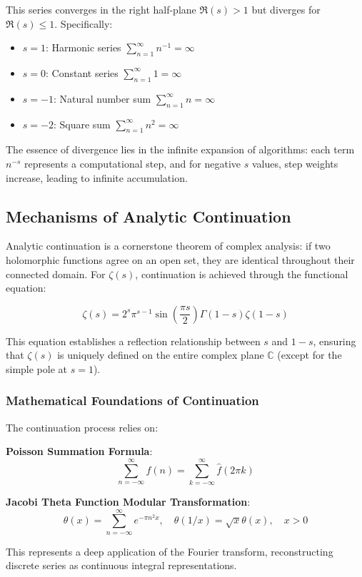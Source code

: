 \documentclass[11pt]{article}
\begin{document}
This series converges in the right half-plane $\Re(s) > 1$ but diverges for $\Re(s) \leq 1$. Specifically:
\begin{itemize}
\item $s = 1$: Harmonic series $\sum_{n=1}^{\infty} n^{-1} = \infty$
\item $s = 0$: Constant series $\sum_{n=1}^{\infty} 1 = \infty$
\item $s = -1$: Natural number sum $\sum_{n=1}^{\infty} n = \infty$
\item $s = -2$: Square sum $\sum_{n=1}^{\infty} n^2 = \infty$
\end{itemize}

The essence of divergence lies in the infinite expansion of algorithms: each term $n^{-s}$ represents a computational step, and for negative $s$ values, step weights increase, leading to infinite accumulation.

\subsection{Mechanisms of Analytic Continuation}

Analytic continuation is a cornerstone theorem of complex analysis: if two holomorphic functions agree on an open set, they are identical throughout their connected domain. For $\zeta(s)$, continuation is achieved through the functional equation:

$$\zeta(s) = 2^s \pi^{s-1} \sin\left(\frac{\pi s}{2}\right) \Gamma(1-s) \zeta(1-s)$$

This equation establishes a reflection relationship between $s$ and $1-s$, ensuring that $\zeta(s)$ is uniquely defined on the entire complex plane $\mathbb{C}$ (except for the simple pole at $s=1$).

\subsubsection{Mathematical Foundations of Continuation}

The continuation process relies on:

\textbf{Poisson Summation Formula}:
$$\sum_{n=-\infty}^{\infty} f(n) = \sum_{k=-\infty}^{\infty} \hat{f}(2\pi k)$$

\textbf{Jacobi Theta Function Modular Transformation}:
$$\theta(x) = \sum_{n=-\infty}^{\infty} e^{-\pi n^2 x}, \quad \theta(1/x) = \sqrt{x} \theta(x), \quad x > 0$$

This represents a deep application of the Fourier transform, reconstructing discrete series as continuous integral representations.
\end{document}
